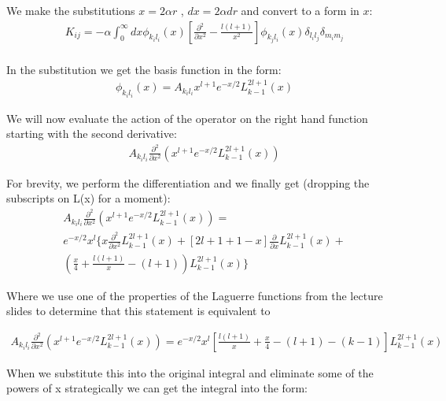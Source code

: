 \documentclass{article}
\begin{document}
    We make the substitutions $x=2\alpha r$ , $dx=2\alpha dr$ and convert to a form in $x$:
    \large
    \begin{gather}
    	K_{ij} = -\alpha\int_{0}^{\infty} dx \phi_{k_il_i}(x) \left[\frac{\partial^2}{\partial x^2} -\frac{l(l+1)}{x^2}\right] \phi_{k_jl_i}(x) \delta_{l_il_j} \delta_{m_im_j}\\
    \end{gather}
    \normalsize
    
    In the substitution we get the basis function in the form:
    \large
    \begin{gather}
    	\phi_{k_il_i}(x) = A_{k_il_i} x^{l+1} e^{-x/2} L^{2l+1}_{k-1}(x)
    \end{gather}   
    \normalsize
    
    We will now evaluate the action of the operator on the right hand function starting with the second derivative:
    \large
    \begin{gather}
    	A_{k_il_i} \frac{\partial^2}{\partial x^2}(x^{l+1} e^{-x/2} L^{2l+1}_{k-1}(x))
    \end{gather}   
    \normalsize
    
    For brevity, we perform the differentiation and we finally get (dropping the subscripts on L(x) for a moment):
    \large
    \begin{gather}
    	A_{k_il_i} \frac{\partial^2}{\partial x^2}(x^{l+1} e^{-x/2} L^{2l+1}_{k-1}(x)) = \\
    	e^{-x/2}x^l \{x\frac{\partial^2}{\partial x^2}L^{2l+1}_{k-1}(x) + [2l+1+1-x]\frac{\partial}{\partial x}L^{2l+1}_{k-1}(x) +\\
    	 (\frac{x}{4} + \frac{l(l+1)}{x} -(l+1))L^{2l+1}_{k-1}(x)  \}
    \end{gather}
    \normalsize
    
    Where we use one of the properties of the Laguerre functions from the lecture slides to determine that this statement is equivalent to
    
    \large
    \begin{gather}
    	A_{k_il_i} \frac{\partial^2}{\partial x^2}(x^{l+1} e^{-x/2} L^{2l+1}_{k-1}(x)) = 
    	e^{-x/2}x^l \left[ \frac{l(l+1)}{x} + \frac{x}{4} - (l+1) - (k-1) \right] L^{2l+1}_{k-1}(x)
    \end{gather}
    \normalsize
    
    When we substitute this into the original integral and eliminate some of the powers of x strategically we can get the integral into the form:
    
\end{document}
